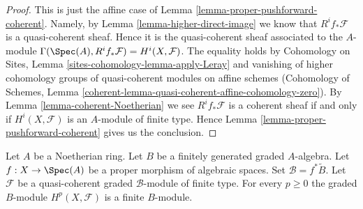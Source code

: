 \begin{proof}
This is just the affine case of Lemma \ref{lemma-proper-pushforward-coherent}.
Namely, by Lemma \ref{lemma-higher-direct-image} we know that
$R^if_*\mathcal{F}$ is a quasi-coherent sheaf. Hence it is the quasi-coherent
sheaf associated to the $A$-module
$\Gamma(\Spec(A), R^if_*\mathcal{F}) = H^i(X, \mathcal{F})$.
The equality holds by
Cohomology on Sites, Lemma \ref{sites-cohomology-lemma-apply-Leray}
and vanishing of higher cohomology groups of quasi-coherent modules
on affine schemes (Cohomology of Schemes, Lemma
\ref{coherent-lemma-quasi-coherent-affine-cohomology-zero}).
By Lemma \ref{lemma-coherent-Noetherian} we see $R^if_*\mathcal{F}$ is
a coherent sheaf if and only if $H^i(X, \mathcal{F})$
is an $A$-module of finite type. Hence
Lemma \ref{lemma-proper-pushforward-coherent} gives us the conclusion.
\end{proof}

\begin{lemma}
\label{lemma-graded-finiteness}
Let $A$ be a Noetherian ring.
Let $B$ be a finitely generated graded $A$-algebra.
Let $f : X \to \Spec(A)$ be a proper morphism of algebraic spaces.
Set $\mathcal{B} = f^*\widetilde B$.
Let $\mathcal{F}$ be a quasi-coherent
graded $\mathcal{B}$-module of finite type.
For every $p \geq 0$ the graded $B$-module $H^p(X, \mathcal{F})$
is a finite $B$-module.
\end{lemma}

